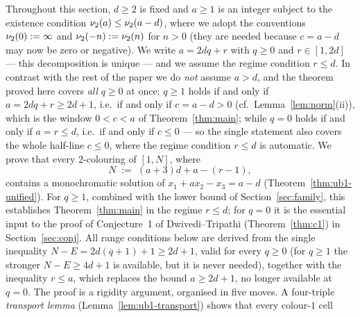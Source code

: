 ﻿%

Throughout this section, $d \ge 2$ is fixed and $a \ge 1$ is an integer
subject to the
existence condition $\nu_2(a) \le \nu_2(a-d)$, where we adopt the conventions
$\nu_2(0) := \infty$ and $\nu_2(-n) := \nu_2(n)$ for $n > 0$ (they are needed
because $c = a - d$ may now be zero or negative). We write $a = 2dq + r$ with
$q \ge 0$ and $r \in [1, 2d]$ --- this decomposition is unique --- and we
assume the regime condition $r \le d$. In contrast with the rest of the
paper we do \emph{not} assume $a > d$, and the theorem proved here covers
\emph{all} $q \ge 0$ at once: $q \ge 1$ holds if and only if
$a = 2dq + r \ge 2d + 1$, i.e.\ if and only if $c = a - d > 0$
(cf.\ Lemma~\ref{lem:norm}(ii)), which is the window $0 < c < a$ of
Theorem~\ref{thm:main}; while $q = 0$ holds if and only if $a = r \le d$,
i.e.\ if and only if $c \le 0$ --- so the single statement also covers the
whole half-line $c \le 0$, where the regime condition $r \le d$ is
automatic. We prove that every $2$-colouring of $[1,N]$, where
\[
N \;:=\; (a+3)d + a - (r-1),
\]
contains a monochromatic solution of $x_1 + a x_2 - x_3 = a - d$
(Theorem~\ref{thm:ub1-unified}). For $q \ge 1$, combined with the lower
bound of Section~\ref{sec:family}, this establishes Theorem~\ref{thm:main}
in the regime $r \le d$; for $q = 0$ it is the essential input to the proof
of Conjecture~1 of Dwivedi--Tripathi (Theorem~\ref{thm:c1}) in
Section~\ref{sec:conj}. All range conditions below are derived from the
single inequality $N - E = 2d(q+1) + 1 \ge 2d + 1$, valid for every
$q \ge 0$ (for $q \ge 1$ the stronger $N - E \ge 4d + 1$ is available, but
it is never needed), together with the inequality $r \le a$, which replaces
the bound $a \ge 2d + 1$, no longer available at $q = 0$. The proof is a
rigidity argument, organised in five moves. A four-triple \emph{transport
lemma} (Lemma~\ref{lem:ub1-transport}) shows that every colour-$1$ cell
